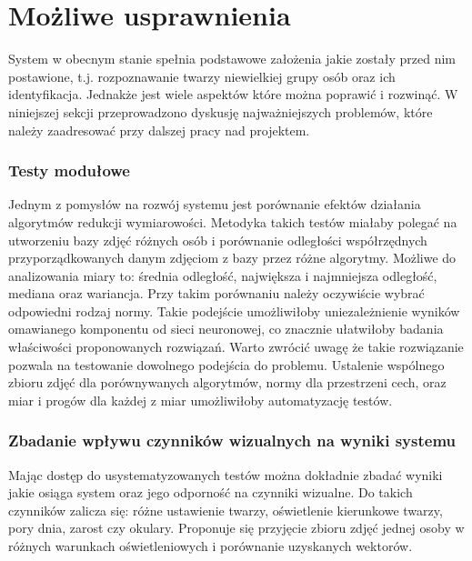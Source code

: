 \documentclass[oneside, eng]{mgr}
\begin{document}
\section{Możliwe usprawnienia}

System w obecnym stanie spełnia podstawowe założenia jakie zostały przed nim postawione, t.j. rozpoznawanie twarzy niewielkiej grupy osób oraz ich identyfikacja. Jednakże jest wiele aspektów które można poprawić i rozwinąć. W niniejszej sekcji przeprowadzono dyskusję najważniejszych problemów, które należy zaadresować przy dalszej pracy nad projektem.

\subsubsection{Testy modułowe}

Jednym z pomysłów na rozwój systemu jest porównanie efektów działania algorytmów redukcji wymiarowości. Metodyka takich testów miałaby polegać na utworzeniu bazy zdjęć różnych osób i porównanie odległości współrzędnych przyporządkowanych danym zdjęciom z bazy przez różne algorytmy. Możliwe do analizowania miary to: średnia odległość, największa i najmniejsza odległość, mediana oraz wariancja. Przy takim porównaniu należy oczywiście wybrać odpowiedni rodzaj normy. Takie podejście umożliwiłoby uniezależnienie wyników omawianego komponentu od sieci neuronowej, co znacznie ułatwiłoby badania właściwości proponowanych rozwiązań. Warto zwrócić uwagę że takie rozwiązanie pozwala na testowanie dowolnego podejścia do problemu. Ustalenie wspólnego zbioru zdjęć dla porównywanych algorytmów, normy dla przestrzeni cech, oraz miar i progów dla każdej z miar umożliwiłoby automatyzację testów.


\subsubsection{Zbadanie wpływu czynników wizualnych na wyniki systemu}
Mając dostęp do usystematyzowanych testów można dokładnie zbadać wyniki jakie osiąga system oraz jego odporność na czynniki wizualne. Do takich czynników zalicza się: różne ustawienie twarzy, oświetlenie kierunkowe twarzy, pory dnia, zarost czy okulary. Proponuje się przyjęcie zbioru zdjęć jednej osoby w różnych warunkach oświetleniowych i porównanie uzyskanych wektorów.
\end{document}
